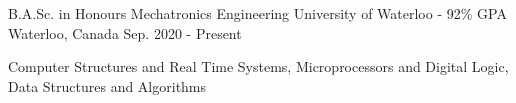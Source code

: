 

\begin{cventries}

  \cventry
    {B.A.Sc. in Honours Mechatronics Engineering} %
    {University of Waterloo - 92\% GPA} %
    {Waterloo, Canada} %
    {Sep. 2020 - Present} %
    {
      \begin{cvitems}
        \item{Computer Structures and Real Time Systems, Microprocessors and Digital Logic, Data Structures and Algorithms}
      \end{cvitems}
    }
\end{cventries}
